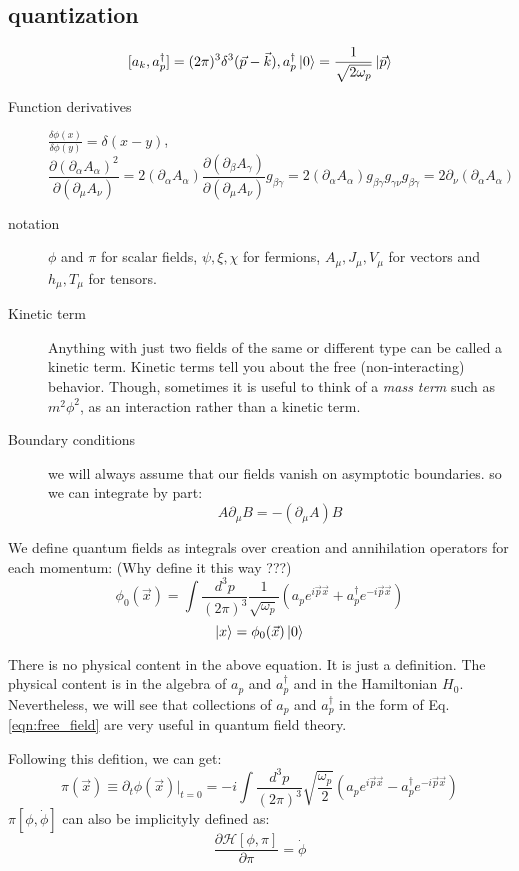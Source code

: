 \subsection{quantization}
\[ [a_k, a_p^{\dag}] = (2\pi)^{3}\delta^{3}(\vec{p}-\vec{k}), 
a_p^{\dag}\ket{0} = \frac{1}{\sqrt{2\omega_p}}\ket{\vec{p}} \]

\begin{description}
    \item [Function derivatives]
	$\frac{\delta \phi(x)}{\delta \phi(y)} = \delta(x-y)$, 
	\[ 
	\frac{\partial(\partial_\alpha A_\alpha)^2}{\partial(\partial_{\mu}A_\nu)}
	=2(\partial_{\alpha}A_\alpha)\frac{\partial(\partial_{\beta}A_\gamma)}{\partial(\partial_{\mu}A_\nu)}g_{\beta\gamma}
	=2(\partial_{\alpha}A_\alpha)g_{\beta\gamma}g_{\gamma\nu}g_{\beta\gamma}
	=2\partial_{\nu}(\partial_{\alpha}A_\alpha)
	\]
    \item [notation] $\phi$ and $\pi$ for scalar fields, $\psi, \xi,
	\chi$ for fermions, $A_{\mu}, J_{\mu}, V_{\mu}$ for vectors and
	$h_{\mu},T_{\mu}$ for tensors.
    \item [Kinetic term] Anything with just two fields of the same or
	different type can be called a kinetic term. Kinetic terms tell you
	about the free (non-interacting) behavior. Though, sometimes it is useful to
	think of a \emph{mass term} such as $m^2\phi^2$, as an interaction
	rather than a kinetic term.
    \item [Boundary conditions] we will always assume that our fields vanish
	on asymptotic boundaries. so we can integrate by part:
	\emph{\[ A\partial_\mu B = -(\partial_\mu A) B\]}
\end{description}

We define quantum fields as integrals over creation and annihilation
operators for each momentum: (Why define it this way ???)
\begin{equation}
\phi_0(\vec{x}) = \int \frac{d^{3}p}{(2\pi)^3}
\frac{1}{\sqrt{\omega_p}}(a_pe^{i\vec{p}\vec{x}} + a_p^\dag
e^{-i\vec{p}\vec{x}})
    \label{eqn:free_field}
\end{equation}
\[ \ket{x} = \phi_0(\vec{x}) \ket{0} \]

There is no physical content in the above equation. It is just a definition.
The physical content is in the algebra of $a_p$ and $a_p^{\dag}$ and in the
Hamiltonian $H_0$. Nevertheless, we will see that collections of $a_p$ and
$a_p^{\dag}$ in the form of Eq.\ref{eqn:free_field} are very useful in
quantum field theory.

Following this defition, we can get:
\[ \pi(\vec{x}) \equiv \partial_t \phi(\vec{x})|_{t=0} = 
-i \int \frac{d^{3}p}{(2\pi)^3} \sqrt{\frac{\omega_p}{2}}(a_pe^{i\vec{p}\vec{x}} - a_p^\dag e^{-i\vec{p}\vec{x}}) \]
$\pi[\phi, \dot{\phi}]$ can also be implicityly defined as:
\[ \frac{\partial \mathcal{H}[\phi, \pi ]}{\partial \pi } = \dot{\phi}\]

